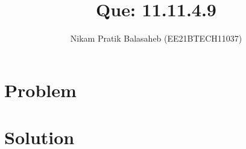 \documentclass[journal,12pt,twocolumn]{IEEEtran}
\begin{document}
\let\StandardTheFigure\thefigure
\let\vec\mathbf
\renewcommand{\thefigure}{\theproblem}



\def\putbox#1#2#3{\makebox[0in][l]{\makebox[#1][l]{}\raisebox{\baselineskip}[0in][0in]{\raisebox{#2}[0in][0in]{#3}}}}
     \def\rightbox#1{\makebox[0in][r]{#1}}
     \def\centbox#1{\makebox[0in]{#1}}
     \def\topbox#1{\raisebox{-\baselineskip}[0in][0in]{#1}}
     \def\midbox#1{\raisebox{-0.5\baselineskip}[0in][0in]{#1}}

\vspace{3cm}


\title{Que: 11.11.4.9}
\author{Nikam Pratik Balasaheb (EE21BTECH11037)}





\maketitle

\newpage


\bigskip

\renewcommand{\thefigure}{\theenumi}
\renewcommand{\thetable}{\theenumi}

\section{Problem}

\section{Solution}
\fi
\end{document}
